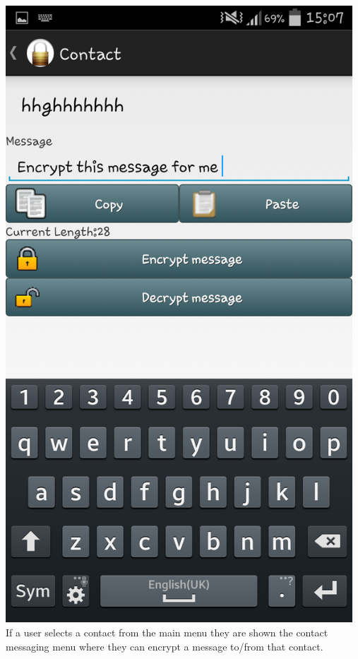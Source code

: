 \begin{center}
 \includegraphics[width=13cm]{screenshots/normal/5_ContactPreEncrypt.png}
\textbf{\\}
 If a user selects a contact from the main menu they are shown the contact messaging menu where they can encrypt a message to/from that contact.
\end{center}
